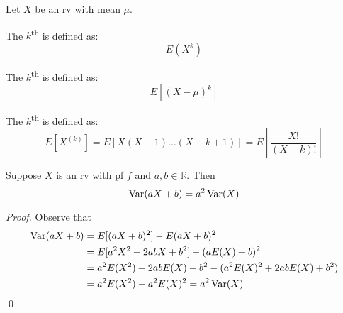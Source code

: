 \documentclass[notoc,notitlepage]{tufte-book}
\begin{document}
\begin{defn}[Moments]
\label{defn:moments}
  Let $X$ be an rv with mean $\mu$.

  The $k$\textsuperscript{th}  is defined as:
  \begin{equation*}
    E(X^k)
  \end{equation*}

  The $k$\textsuperscript{th}  is defined as:
  \begin{equation*}
    E[ (X - \mu)^k ]
  \end{equation*}

  The $k$\textsuperscript{th}  is defined as:
  \begin{equation*}
    E[ X^{(k)} ] = E [ X (X - 1) \hdots (X - k + 1) ] = E \left[ \frac{X!}{(X - k)!} \right]
  \end{equation*}
\end{defn}

\begin{thm}
\label{thm:variance_of_a_linear_function}
  Suppose $X$ is an rv with pf $f$ and $a, b \in \mathbb{R}$. Then
  \begin{equation*}
    \operatorname{Var}(aX + b) = a^2 \operatorname{Var}(X)
  \end{equation*}
\end{thm}

\begin{proof}
  Observe that
  \begin{align*}
    \operatorname{Var}(aX + b) &= E[ (aX + b)^2 ] - E(aX + b)^2 \\
                 &= E[ a^2 X^2 + 2abX + b^2 ] - (aE(X) + b)^2 \\
                 &= a^2 E(X^2) + 2abE(X) + b^2 - (a^2 E(X)^2 + 2abE(X) + b^2) \\
                 &= a^2 E(X^2) - a^2 E(X)^2 = a^2 \operatorname{Var}(X)
  \end{align*}\qed
\end{proof}
\end{document}
